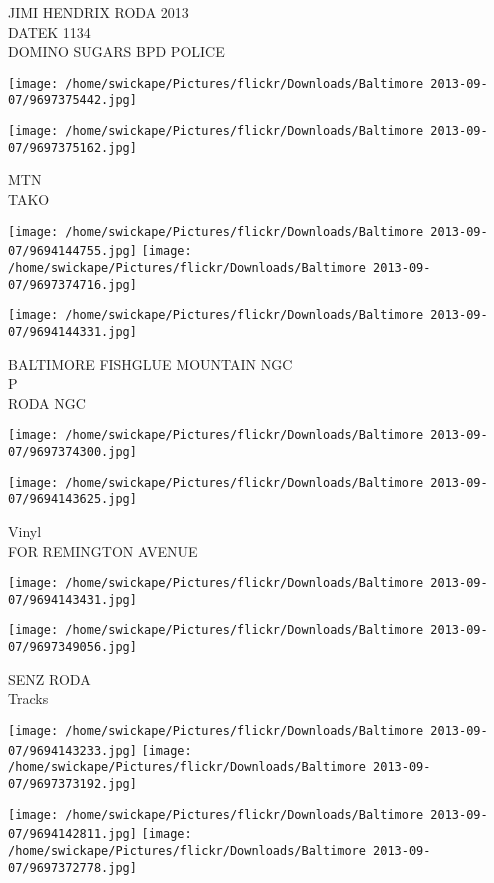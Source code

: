\documentclass[10pt,letterpaper]{article}
\begin{document}
JIMI HENDRIX RODA 2013\\
DATEK 1134\\
DOMINO SUGARS BPD POLICE
\pagebreak

\texttt{[image: /home/swickape/Pictures/flickr/Downloads/Baltimore 2013-09-07/9697375442.jpg]}

\vspace{0.25in}
\texttt{[image: /home/swickape/Pictures/flickr/Downloads/Baltimore 2013-09-07/9697375162.jpg]}

MTN\\
TAKO
\pagebreak

\texttt{[image: /home/swickape/Pictures/flickr/Downloads/Baltimore 2013-09-07/9694144755.jpg]}
\texttt{[image: /home/swickape/Pictures/flickr/Downloads/Baltimore 2013-09-07/9697374716.jpg]}

\texttt{[image: /home/swickape/Pictures/flickr/Downloads/Baltimore 2013-09-07/9694144331.jpg]}

BALTIMORE FISHGLUE MOUNTAIN NGC\\
P\\
RODA NGC
\pagebreak

\texttt{[image: /home/swickape/Pictures/flickr/Downloads/Baltimore 2013-09-07/9697374300.jpg]}

\vspace{0.25in}
\texttt{[image: /home/swickape/Pictures/flickr/Downloads/Baltimore 2013-09-07/9694143625.jpg]}

Vinyl\\
FOR REMINGTON AVENUE
\pagebreak

\texttt{[image: /home/swickape/Pictures/flickr/Downloads/Baltimore 2013-09-07/9694143431.jpg]}

\vspace{0.25in}
\texttt{[image: /home/swickape/Pictures/flickr/Downloads/Baltimore 2013-09-07/9697349056.jpg]}

SENZ RODA\\
Tracks
\pagebreak

\texttt{[image: /home/swickape/Pictures/flickr/Downloads/Baltimore 2013-09-07/9694143233.jpg]}
\texttt{[image: /home/swickape/Pictures/flickr/Downloads/Baltimore 2013-09-07/9697373192.jpg]}

\texttt{[image: /home/swickape/Pictures/flickr/Downloads/Baltimore 2013-09-07/9694142811.jpg]}
\texttt{[image: /home/swickape/Pictures/flickr/Downloads/Baltimore 2013-09-07/9697372778.jpg]}
\end{document}
